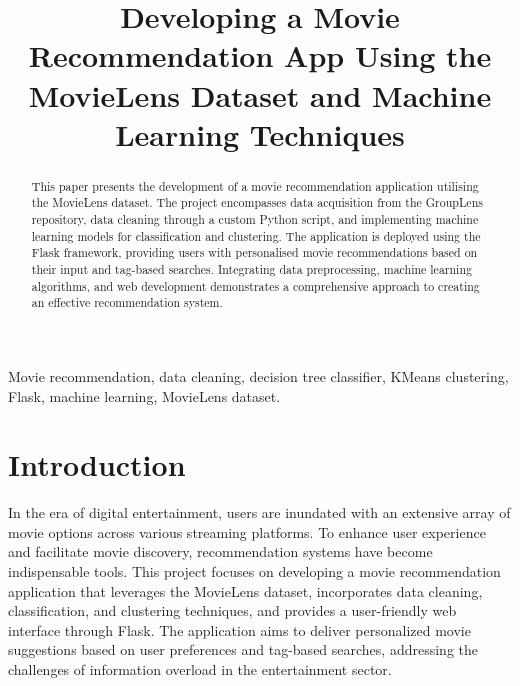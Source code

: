 \documentclass[conference]{IEEEtran}
\begin{document}
\title{Developing a Movie Recommendation App Using the MovieLens Dataset and Machine Learning Techniques\\}


\author{
}

\maketitle

\begin{abstract}
This paper presents the development of a movie recommendation application utilising the MovieLens dataset. The project encompasses data acquisition from the GroupLens repository, data cleaning through a custom Python script, and implementing machine learning models for classification and clustering. The application is deployed using the Flask framework, providing users with personalised movie recommendations based on their input and tag-based searches. Integrating data preprocessing, machine learning algorithms, and web development demonstrates a comprehensive approach to creating an effective recommendation system.
\end{abstract}

\begin{IEEEkeywords}
Movie recommendation, data cleaning, decision tree classifier, KMeans clustering, Flask, machine learning, MovieLens dataset.
\end{IEEEkeywords}

\section{Introduction}
In the era of digital entertainment, users are inundated with an extensive array of movie options across various streaming platforms. To enhance user experience and facilitate movie discovery, recommendation systems have become indispensable tools. This project focuses on developing a movie recommendation application that leverages the MovieLens dataset, incorporates data cleaning, classification, and clustering techniques, and provides a user-friendly web interface through Flask. The application aims to deliver personalized movie suggestions based on user preferences and tag-based searches, addressing the challenges of information overload in the entertainment sector.
\end{document}
